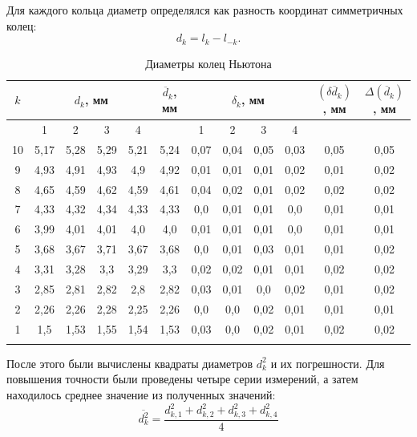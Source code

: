 Для каждого кольца диаметр определялся как разность координат симметричных колец:
\[
d_k = l_k - l_{-k}.
\]

\begin{table}[H]
	\centering
	\caption{Диаметры колец Ньютона}
	\begin{tabular}{cccccccccccc}
		\toprule
		$k$ & \multicolumn{4}{c}{$d_k$, мм} & $\overline{d}_{k}$, мм &  \multicolumn{4}{c}{$\delta_k$, мм} & $(\delta \overline{d}_k)$, мм & $\Delta (\overline{d}_k)$, мм\\
		\midrule
		& 1 & 2 & 3 & 4 &  &  1 & 2 & 3 & 4 & & \\
		\midrule
		10 & 5,17 & 5,28 & 5,29 & 5,21 & 5,24 & 0,07 & 0,04 & 0,05 & 0,03 & 0,05 & 0,05 \\ 
		9 & 4,93 & 4,91 & 4,93 & 4,9 & 4,92 & 0,01 & 0,01 & 0,01 & 0,02 & 0,01 & 0,02 \\ 
		8 & 4,65 & 4,59 & 4,62 & 4,59 & 4,61 & 0,04 & 0,02 & 0,01 & 0,02 & 0,02 & 0,02 \\ 
		7 & 4,33 & 4,32 & 4,34 & 4,33 & 4,33 & 0,0 & 0,01 & 0,01 & 0,0 & 0,01 & 0,01 \\ 
		6 & 3,99 & 4,01 & 4,01 & 4,0 & 4,0 & 0,01 & 0,01 & 0,01 & 0,0 & 0,01 & 0,01 \\ 
		5 & 3,68 & 3,67 & 3,71 & 3,67 & 3,68 & 0,0 & 0,01 & 0,03 & 0,01 & 0,01 & 0,02 \\ 
		4 & 3,31 & 3,28 & 3,3 & 3,29 & 3,3 & 0,02 & 0,02 & 0,01 & 0,01 & 0,02 & 0,02 \\ 
		3 & 2,85 & 2,81 & 2,82 & 2,8 & 2,82 & 0,03 & 0,01 & 0,0 & 0,02 & 0,01 & 0,02 \\ 
		2 & 2,26 & 2,26 & 2,28 & 2,25 & 2,26 & 0,0 & 0,0 & 0,02 & 0,01 & 0,01 & 0,01 \\ 
		1 & 1,5 & 1,53 & 1,55 & 1,54 & 1,53 & 0,03 & 0,0 & 0,02 & 0,01 & 0,02 & 0,02 \\
		\bottomrule& 
	\end{tabular}
\end{table}

После этого были вычислены квадраты диаметров $d_k^2$ и их погрешности. Для повышения точности были проведены четыре серии измерений, а затем находилось среднее значение из полученных значений:
\[
\overline{d_k^2} = \frac{d_{k,1}^2 + d_{k,2}^2 + d_{k,3}^2 + d_{k,4}^2}{4}
\]

